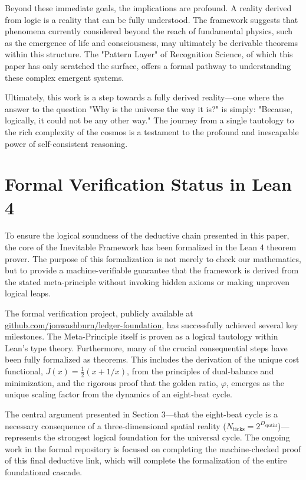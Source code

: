 \documentclass[11pt,a4paper]{article}
\begin{document}
Beyond these immediate goals, the implications are profound. A reality derived from logic is a reality that can be fully understood. The framework suggests that phenomena currently considered beyond the reach of fundamental physics, such as the emergence of life and consciousness, may ultimately be derivable theorems within this structure. The "Pattern Layer" of Recognition Science, of which this paper has only scratched the surface, offers a formal pathway to understanding these complex emergent systems.

Ultimately, this work is a step towards a fully derived reality—one where the answer to the question "Why is the universe the way it is?" is simply: "Because, logically, it could not be any other way." The journey from a single tautology to the rich complexity of the cosmos is a testament to the profound and inescapable power of self-consistent reasoning.

\appendix
\section{Formal Verification Status in Lean 4}
To ensure the logical soundness of the deductive chain presented in this paper, the core of the Inevitable Framework has been formalized in the Lean 4 theorem prover. The purpose of this formalization is not merely to check our mathematics, but to provide a machine-verifiable guarantee that the framework is derived from the stated meta-principle without invoking hidden axioms or making unproven logical leaps.

The formal verification project, publicly available at \href{https://github.com/jonwashburn/ledger-foundation}{github.com/jonwashburn/ledger-foundation}, has successfully achieved several key milestones. The Meta-Principle itself is proven as a logical tautology within Lean's type theory. Furthermore, many of the crucial consequential steps have been fully formalized as theorems. This includes the derivation of the unique cost functional, \(J(x) = \frac{1}{2}(x + 1/x)\), from the principles of dual-balance and minimization, and the rigorous proof that the golden ratio, \(\varphi\), emerges as the unique scaling factor from the dynamics of an eight-beat cycle.

The central argument presented in Section 3—that the eight-beat cycle is a necessary consequence of a three-dimensional spatial reality (\(N_{\text{ticks}} = 2^{D_{\text{spatial}}}\))—represents the strongest logical foundation for the universal cycle. The ongoing work in the formal repository is focused on completing the machine-checked proof of this final deductive link, which will complete the formalization of the entire foundational cascade.
\end{document}

